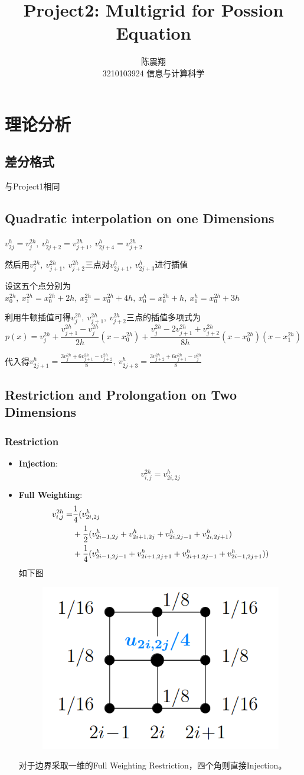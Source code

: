 \documentclass{article}
\title{{\bf Project2: Multigrid for Possion Equation}}
\author{陈震翔\\3210103924 信息与计算科学}
\date{}
\begin{document}
\maketitle

\section{理论分析}
\subsection{差分格式}
与Project1相同
\subsection{Quadratic interpolation on one Dimensions}
$v_{2j}^h = v_j^{2h},\ v_{2j+2}^h = v_{j+1}^{2h},\ v_{2j+4}^h = v_{j+2}^{2h}$

然后用$v_j^{2h},\ v_{j+1}^{2h},\ v_{j+2}^{2h}$三点对$v_{2j+1}^h,\ v_{2j+3}^h$进行插值

设这五个点分别为$x_0^{2h},\ x_1^{2h}=x_0^{2h}+2h,\ x_2^{2h}=x_0^{2h}+4h,\ x_0^h=x_0^{2h}+h,\ x_1^h=x_0^{2h}+3h$

利用牛顿插值可得$v_j^{2h},\ v_{j+1}^{2h},\ v_{j+2}^{2h}$三点的插值多项式为
$$p(x) = v_j^{2h}+\frac{v_{j+1}^{2h}-v_j^{2h}}{2h}(x-x_0^{2h})+\frac{v_j^{2h}-2v_{j+1}^{2h}+v_{j+2}^{2h}}{8h}(x-x_0^{2h})(x-x_1^{2h})$$

代入得$v_{2j+1}^h=\frac{3v_j^{2h}+6v_{j+1}^{2h}-v_{j+2}^{2h}}{8},\ v_{2j+3}^h=\frac{3v_{j+2}^{2h}+6v_{j+1}^{2h}-v_{j}^{2h}}{8}$
\subsection{Restriction and Prolongation on Two Dimensions}
\subsubsection{Restriction}
\begin{itemize}
    \item \textbf{Injection}: $$v_{i,j}^{2h} = v_{2i,2j}^{h}$$
    \item \textbf{Full Weighting}:
    \begin{align}
        v_{i,j}^{2h} = & \frac{1}{4}(v_{2i,2j}^{h} \notag \\
        &+\frac{1}{2}(v_{2i-1,2j}^{h}+v_{2i+1,2j}^{h}+v_{2i,2j-1}^{h}+v_{2i,2j+1}^{h}) \notag \\
        &+\frac{1}{4}(v_{2i-1,2j-1}^{h}+v_{2i+1,2j+1}^{h}+v_{2i+1,2j-1}^{h}+v_{2i-1,2j+1}^{h})) \notag
    \end{align}
    如下图
    \begin{figure}[h]
        \centering
        \includegraphics[width = 0.25\linewidth]{fw2D.png}
    \end{figure}

    对于边界采取一维的Full Weighting Restriction，四个角则直接Injection。
\end{itemize}
\end{document}
